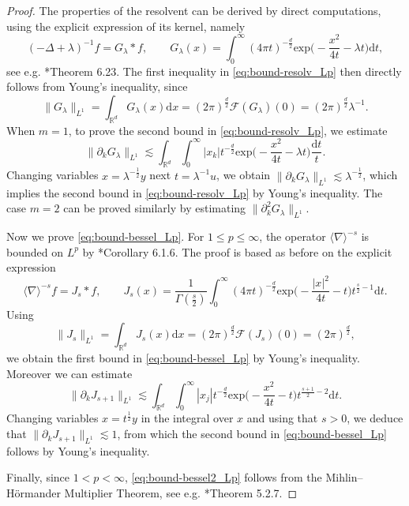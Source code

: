 \documentclass[12pt]{article}
\theoremstyle{plain}
\begin{document}
\begin{proof}
The properties of the resolvent can be derived by direct computations, using the explicit expression of its kernel, namely \begin{equation*}
    (-\Delta + \lambda )^{-1} f= G_\lambda*f, \qquad G_\lambda(x)=\int_0^\infty(4\pi t)^{-\frac{d}2}\mathrm{exp}\Big(-\frac{x^2}{4t}-\lambda t\Big)\mathrm{d}t,
\end{equation*} 
see e.g. \cite{LiebLoss}*{Theorem 6.23}. The first inequality in \eqref{eq:bound-resolv_Lp} then directly follows from Young's inequality, since
\begin{equation*}
    \|G_\lambda\|_{L^1}=\int_{\mathbb{R}^d}G_\lambda(x)\mathrm{d}x=(2\pi)^{\frac{d}{2}}\mathcal{F}(G_\lambda)(0)=(2\pi)^{\frac{d}{2}}\lambda^{-1}.
\end{equation*}
When $m=1$, to prove the second bound in \eqref{eq:bound-resolv_Lp}, we estimate
\begin{equation*}
    \|\partial_kG_\lambda\|_{L^1}\lesssim\int_{\mathbb{R}^d}\int_0^\infty|x_k|t^{-\frac{d}{2}}\mathrm{exp}\Big(-\frac{x^2}{4t}-\lambda t\Big)\frac{\mathrm{d}t}{t}.
\end{equation*}
Changing variables $x=\lambda^{-\frac12}y$ next $t=\lambda^{-1}u$, we obtain $\|\partial_kG_\lambda\|_{L^1}\lesssim\lambda^{-\frac12}$, which implies the second bound in \eqref{eq:bound-resolv_Lp} by Young's inequality. The case $m=2$ can be proved similarly by estimating $\|\partial_k^2 G_\lambda\|_{L^1}$.

Now we prove \eqref{eq:bound-bessel_Lp}. For $1 \leq p \leq \infty $, the operator $\langle \nabla \rangle^{-s}$ is bounded on $L^p$ by \cite{grafakos_modern}*{Corollary 6.1.6}. The proof is based as before on the explicit expression
\begin{equation*}
    \langle\nabla\rangle^{-s} f= J_s*f, \qquad J_s(x)=\frac{1}{\Gamma(\frac{s}{2})}\int_0^\infty (4\pi t)^{-\frac{d}{2}}\mathrm{exp}\Big(-\frac{|x|^2}{4t}-t\Big)t^{\frac{s}{2}-1}\mathrm{d}t.
\end{equation*} 
Using
\begin{equation*}
    \|J_s\|_{L^1}=\int_{\mathbb{R}^d}J_s(x)\mathrm{d}x=(2\pi)^{\frac{d}{2}}\mathcal{F}(J_s)(0)=(2\pi)^{\frac{d}{2}},
\end{equation*}
we obtain the first bound in \eqref{eq:bound-bessel_Lp} by Young's inequality. Moreover we can estimate
\begin{equation*}
    \|\partial_kJ_{s+1}\|_{L^1}\lesssim\int_{\mathbb{R}^d}\int_0^\infty|x_j|t^{-\frac{d}{2}}\mathrm{exp}\Big(-\frac{x^2}{4t}-t\Big)t^{\frac{s+1}{2}-2}\mathrm{d}t.
\end{equation*}
Changing variables $x=t^{\frac12}y$ in the integral over $x$ and using that $s>0$, we deduce that $\|\partial_kJ_{s+1}\|_{L^1}\lesssim1$, from which the second bound in \eqref{eq:bound-bessel_Lp} follows by Young's inequality.

Finally, since $1<p<\infty$, \eqref{eq:bound-bessel2_Lp} follows from the Mihlin–Hörmander Multiplier Theorem, see e.g. \cite{grafakos}*{Theorem 5.2.7}.
\end{proof}
\end{document}
